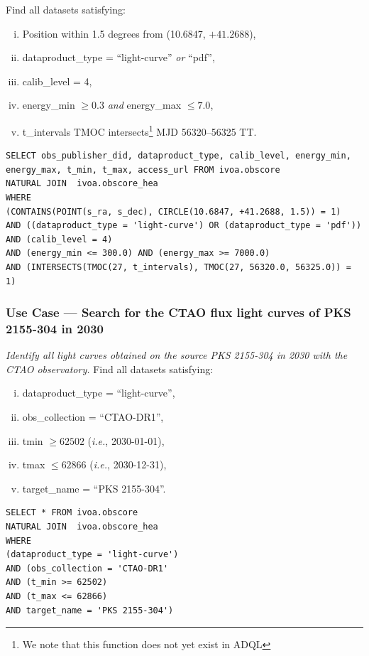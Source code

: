 
\medskip
\noindent Find all datasets satisfying:
\begin{enumerate}[(i)]
  \item Position within 1.5 degrees from (10.6847, $+41.2688$),
  \item dataproduct\_type = ``light-curve'' {\em or\/} ``pdf'',
  \item calib\_level = 4,
   \item energy\_min $\geq 0.3$ {\em and\/} energy\_max $\leq 7.0$,
  \item t\_intervals TMOC intersects\footnote{We note that this function does not yet exist in ADQL} MJD 56320--56325 TT.
\end{enumerate}


\begin{verbatim}
SELECT obs_publisher_did, dataproduct_type, calib_level, energy_min,
energy_max, t_min, t_max, access_url FROM ivoa.obscore
NATURAL JOIN  ivoa.obscore_hea
WHERE
(CONTAINS(POINT(s_ra, s_dec), CIRCLE(10.6847, +41.2688, 1.5)) = 1)
AND ((dataproduct_type = 'light-curve') OR (dataproduct_type = 'pdf'))
AND (calib_level = 4)
AND (energy_min <= 300.0) AND (energy_max >= 7000.0)
AND (INTERSECTS(TMOC(27, t_intervals), TMOC(27, 56320.0, 56325.0)) = 1)
\end{verbatim}

\subsubsection{Use Case --- Search for the CTAO flux light curves of PKS 2155-304 in 2030}

{\em Identify all light curves obtained on the source PKS 2155-304 in 2030 with the CTAO observatory.\/}
\medskip
\noindent Find all datasets satisfying:
\begin{enumerate}[(i)]
  \item dataproduct\_type = ``light-curve'',
  \item obs\_collection = ``CTAO-DR1'',
  \item tmin $\geq 62502$ ({\em i.e.\/}, 2030-01-01),
  \item tmax $\leq 62866$ ({\em i.e.\/}, 2030-12-31),
  \item target\_name = ``PKS 2155-304''.
\end{enumerate}

\begin{verbatim}
SELECT * FROM ivoa.obscore
NATURAL JOIN  ivoa.obscore_hea
WHERE
(dataproduct_type = 'light-curve')
AND (obs_collection = 'CTAO-DR1'
AND (t_min >= 62502)
AND (t_max <= 62866)
AND target_name = 'PKS 2155-304')
\end{verbatim}


